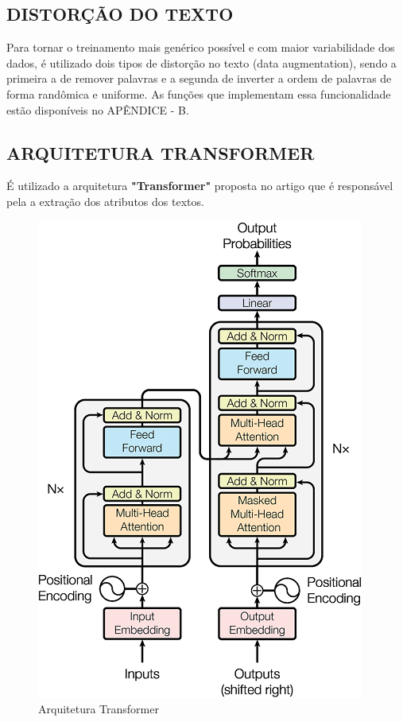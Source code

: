 \subsection{DISTORÇÃO DO TEXTO}

Para tornar o treinamento mais genérico possível e com maior variabilidade dos dados, é utilizado dois tipos de distorção no texto (data augmentation), sendo a primeira a de remover palavras e a segunda de inverter a ordem de palavras de forma randômica e uniforme. As funções que implementam essa funcionalidade estão disponíveis no APÊNDICE - B.

\subsection{ARQUITETURA TRANSFORMER}

É utilizado a arquitetura \textbf{"Transformer"} proposta no artigo \cite{transformer} que é responsável pela a extração dos atributos dos textos.

\begin{figure}[htb]
	\caption{\label{transformer_architecture} Arquitetura Transformer}
	\begin{center}
	    \includegraphics[scale=0.5]{artigo/recursos/imagens/transformer_architecture.png}
	\end{center}
\end{figure}

